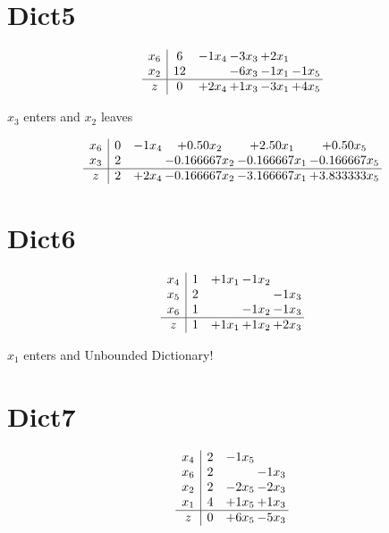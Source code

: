 \documentclass[12pt]{article}
\begin{document}
\section{Dict5}

\[\begin{array}{c| c c@{\hskip 2pt} c@{\hskip 2pt} c@{\hskip 2pt} c@{\hskip 2pt} }
 x_6   &  6 & -1 x_4 & -3 x_3 & + 2 x_1 &   \\
 x_2   &  12  &   & -6 x_3 & -1 x_1 & -1 x_5\\
\hline
z    &  0 & + 2 x_4 & + 1 x_3 & -3 x_1 & + 4 x_5\\
\end{array}\]


 $ x_3 $ enters and $ x_2 $ leaves 

 \[\begin{array}{c| c c@{\hskip 2pt} c@{\hskip 2pt} c@{\hskip 2pt} c@{\hskip 2pt} }
 x_6   &  0 & -1 x_4 & + 0.5  0 x_2 & + 2.5  0 x_1 & + 0.5  0 x_5\\
 x_3   &  2  &   & -0.166667 x_2 & -0.166667 x_1 & -0.166667 x_5\\
\hline
z    &  2 & + 2 x_4 & -0.166667 x_2 & -3.166667 x_1 & + 3.833333 x_5\\
\end{array}\]

\section{Dict6}

\[\begin{array}{c| c c@{\hskip 2pt} c@{\hskip 2pt} c@{\hskip 2pt} }
 x_4   &  1 & + 1 x_1 & -1 x_2 &   \\
 x_5   &  2  &    &   & -1 x_3\\
 x_6   &  1  &   & -1 x_2 & -1 x_3\\
\hline
z    &  1 & + 1 x_1 & + 1 x_2 & + 2 x_3\\
\end{array}\]


 $ x_1 $ enters and Unbounded Dictionary!

\section{Dict7}
\[\begin{array}{c| c c@{\hskip 2pt} c@{\hskip 2pt} }
 x_4   &  2 & -1 x_5 &   \\
 x_6   &  2  &   & -1 x_3\\
 x_2   &  2 & -2 x_5 & -2 x_3\\
 x_1   &  4 & + 1 x_5 & + 1 x_3\\
\hline
z    &  0 & + 6 x_5 & -5 x_3\\
\end{array}\]
\end{document}
